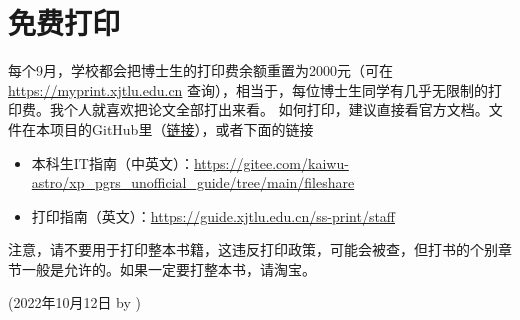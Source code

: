\section{免费打印}
每个9月，学校都会把博士生的打印费余额重置为2000元（可在 \url{https://myprint.xjtlu.edu.cn} 查询），相当于，每位博士生同学有几乎无限制的打印费。我个人就喜欢把论文全部打出来看。
如何打印，建议直接看官方文档。文件在本项目的GitHub里（\href{https://github.com/kaiwu-astro/xp_pgrs_unofficial_guide/tree/main/fileshare}{链接}），或者下面的链接
\begin{itemize}
    \item 本科生IT指南（中英文）：\url{https://gitee.com/kaiwu-astro/xp_pgrs_unofficial_guide/tree/main/fileshare}
    \item 打印指南（英文）：\url{https://guide.xjtlu.edu.cn/ss-print/staff}
\end{itemize}

注意，请不要用于打印整本书籍，这违反打印政策，可能会被查，但打书的个别章节一般是允许的。如果一定要打整本书，请淘宝。


\begin{flushright}
(2022年10月12日 by \Wu)
\end{flushright}
